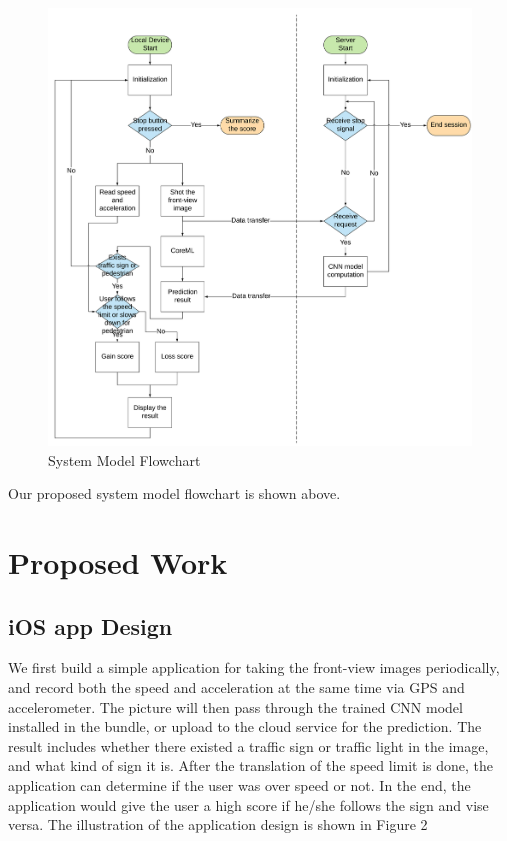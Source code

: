\documentclass[conference]{IEEEtran}
\begin{document}
\begin{figure}[H]
\centering
  \begin{minipage}{.4\textwidth}
    \centering
    \includegraphics[width=1.2\linewidth]{system_flowchart.png}
    \caption{System Model Flowchart}
    \label{fig:fig_1}
  \end{minipage}
\end{figure}

Our proposed system model flowchart is shown above. 
\section{Proposed Work}
\subsection{iOS app Design}

We first build a simple application for taking the front-view images periodically, and record both the speed and acceleration at the same time via GPS and accelerometer. The picture will then pass through the trained CNN model installed in the bundle, or upload to the cloud service for the prediction. The result includes whether there existed a traffic sign or traffic light in the image, and what kind of sign it is. After the translation of the speed limit is done, the application can determine if the user was over speed or not. In the end, the application would give the user a high score if he/she follows the sign and vise versa. The illustration of the application design is shown in Figure 2
\end{document}
